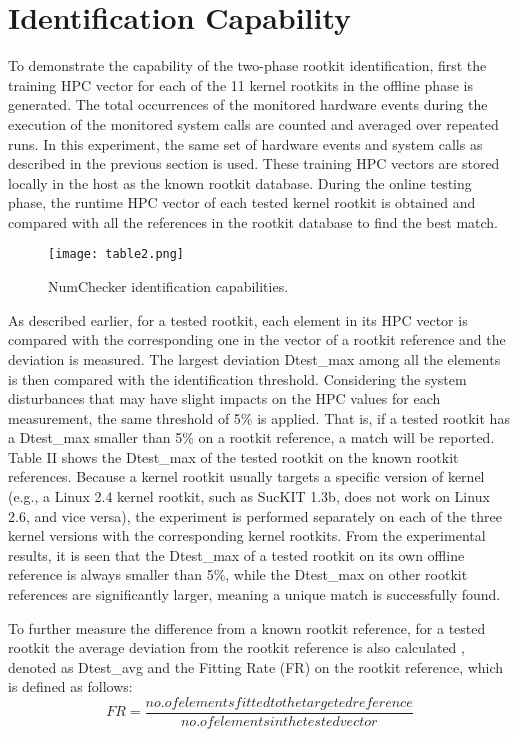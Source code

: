 \documentclass[12pt]{report}
\begin{document}
\section{Identification Capability}
To demonstrate the capability of the two-phase rootkit
identification,  first  the training HPC vector for
each of the 11 kernel rootkits in the offline phase is generated. The
total occurrences of the monitored hardware events during
the execution of the monitored system calls are counted and
averaged over repeated runs. In this experiment, the
same set of hardware events and system calls as described in
the previous section is used. These training HPC vectors are stored locally
in the host as the known rootkit database. During the online
testing phase, the runtime HPC vector of each tested kernel
rootkit is obtained and compared with all the references in the
rootkit database to find the best match.
\begin{figure}[h]
\centering
\texttt{[image: table2.png]}
\caption{NumChecker identification capabilities.}
\end{figure}

As described earlier, for a tested rootkit, each
element in its HPC vector is compared with the corresponding
one in the vector of a rootkit reference and the deviation
is measured. The largest deviation Dtest\_max among all the
elements is then compared with the identification threshold.
Considering the system disturbances that may have slight
impacts on the HPC values for each measurement, the same
threshold of 5\% is applied. That is, if a tested rootkit has a
Dtest\_max smaller than 5\% on a rootkit reference, a match will
be reported. Table II shows the Dtest\_max of the tested rootkit
on the known rootkit references. Because a kernel rootkit
usually targets a specific version of kernel (e.g., a Linux 2.4
kernel rootkit, such as SucKIT 1.3b, does not work on Linux
2.6, and vice versa), the experiment is performed separately
on each of the three kernel versions with the corresponding
kernel rootkits. From the experimental results, it is seen that
the Dtest\_max of a tested rootkit on its own offline reference is
always smaller than 5\%, while the Dtest\_max on other rootkit
references are significantly larger, meaning a unique match is
successfully found.

To further measure the difference from a known rootkit
reference, for a tested rootkit the average
deviation from the rootkit reference is also calculated , denoted as Dtest\_avg and
the Fitting Rate (FR) on the rootkit reference, which is defined
as follows:
\[
    FR =\frac {no. of elements fitted to the targeted reference}
{no. of elements in the tested vector}
\]
\end{document}

